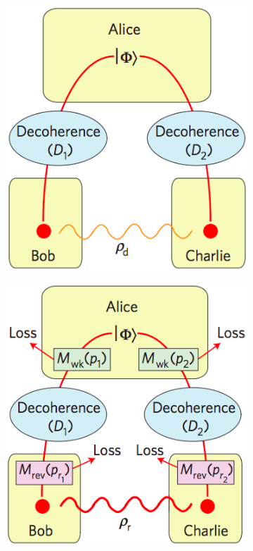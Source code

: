 \documentclass[%
 reprint,
 amsmath,amssymb,
 aps,
]{revtex4-1}
\begin{document}
\begin{figure}
        \centering
        \begin{subfigure}[b]{0.23\textwidth}
                \includegraphics[width=\textwidth]{expd}
                \caption{}
                \label{fig:d}
        \end{subfigure}
        \begin{subfigure}[b]{0.23\textwidth}
                \includegraphics[width=\textwidth]{expw}

\end{subfigure}
\end{figure}
\end{document}
